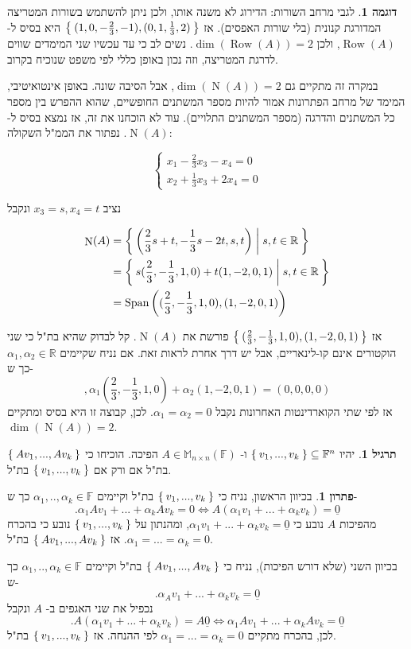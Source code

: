 \documentclass[12pt]{report}
\theoremstyle{plain}
\theoremstyle{definition}
\newtheorem{example}{דוגמה}[chapter]
\newtheorem{exercise}{תרגיל}[chapter]
\newtheorem*{solution}{פתרון}
\newcommand{\R}{\mathbb{R}}
\newcommand{\F}{\mathbb{F}}
\newcommand{\M}{\mathbb{M}}
\newcommand{\0}{\mathbf{0}}
\DeclareMathOperator{\Span}{Span}
\DeclareMathOperator{\Row}{Row}
\DeclareMathOperator{\Null}{N}
\begin{document}
\begin{example}
לגבי מרחב השורות: הדירוג לא משנה אותו, ולכן ניתן להשתמש בשורות המטריצה המדורגת קנונית (בלי שורות האפסים). אז
$\Set{(1,0,-\frac{2}{3},-1),(0,1,\frac{1}{3},2)}$
היא בסיס ל-
$\Row(A)$,
ולכן
$\dim(\Row(A))=2$. 
נשים לב כי עד עכשיו שני המימדים שווים לדרגת המטריצה, וזה נכון באופן כללי לפי משפט שנוכיח בקרוב.

במקרה זה מתקיים גם
$\dim(\Null(A))=2$,
אבל הסיבה שונה. באופן אינטואיטיבי, המימד של מרחב הפתרונות אמור להיות מספר המשתנים החופשיים, שהוא ההפרש בין מספר כל המשתנים והדרגה (מספר המשתנים התלויים). עוד לא הוכחנו את זה, אז נמצא בסיס ל-
$\Null(A)$.
נפתור את הממ"ל השקולה:

$$
\begin{cases}
x_1-\frac{2}{3}x_3-x_4=0 \\
x_2+\frac{1}{3}x_3+2x_4=0
\end{cases}
$$

נציב 
$x_3=s,x_4=t$
ונקבל

$$
\begin{aligned}
\Null(A)&=\Set{\left(\frac{2}{3}s+t,-\frac{1}{3}s-2t,s,t\right)|s,t\in\R} \\
&=\Set{s(\frac{2}{3},-\frac{1}{3},1,0)+t(1,-2,0,1)|s,t\in\R} \\
&=\Span\left((\frac{2}{3},-\frac{1}{3},1,0),(1,-2,0,1)\right)
\end{aligned}
$$

אז 
$\Set{(\frac{2}{3},-\frac{1}{3},1,0),(1,-2,0,1)}$
פורשת את 
$\Null(A)$.
קל לבדוק שהיא בת"ל כי שני הוקטורים אינם קו-לינאריים, אבל יש דרך אחרת לראות זאת. אם נניח שקיימים
$\alpha_1,\alpha_2\in\R$
כך ש-
$$
,\alpha_1(\frac{2}{3},-\frac{1}{3},1,0)+\alpha_2(1,-2,0,1)=(0,0,0,0)
$$
אז לפי שתי הקוארדינטות האחרונות נקבל 
$\alpha_1=\alpha_2=0$.
לכן, קבוצה זו היא בסיס ומתקיים
$\dim(\Null(A))=2$.

\end{example}

\begin{exercise}\label{exer:column-dim}
יהיו
$\Set{v_1,...,v_k}\subseteq\F^n$
ו-
$A\in\M_{n\times n}(\F)$
הפיכה. הוכיחו כי
$\Set{Av_1,...,Av_k}$
בת"ל אם ורק אם
$\Set{v_1,...,v_k}$
בת"ל.
\end{exercise}

\begin{solution}
בכיוון הראשון, נניח כי
$\Set{v_1,...,v_k}$
בת"ל וקיימים
$\alpha_1,..,\alpha_k\in\F$
כך ש-
$$
.\alpha_1Av_1+...+\alpha_kAv_k=0 \iff A(\alpha_1v_1+...+\alpha_kv_k)=\underline{0}
$$
מהפיכות 
$A$
נובע כי
$\alpha_1v_1+...+\alpha_kv_k=\underline{0}$,
ומהנתון על
$\Set{v_1,...,v_k}$
נובע כי בהכרח
$\alpha_1=...=\alpha_k=0$.
אז 
$\Set{Av_1,...,Av_k}$
בת"ל.

בכיוון השני (שלא דורש הפיכות), נניח כי
$\Set{Av_1,...,Av_k}$
בת"ל וקיימים
$\alpha_1,..,\alpha_k\in\F$
כך ש-
$$
.\alpha_Av_1+...+\alpha_kv_k=\underline{0}
$$
נכפיל את שני האגפים ב-
$A$
ונקבל
$$
.A(\alpha_1v_1+...+\alpha_kv_k)=A\underline{0} \iff \alpha_1Av_1+...+\alpha_kAv_k=\underline{0}
$$
לכן, בהכרח מתקיים
$\alpha_1=...=\alpha_k=0$
לפי ההנחה. אז
$\Set{v_1,...,v_k}$
בת"ל.
\end{solution}
\end{document}
